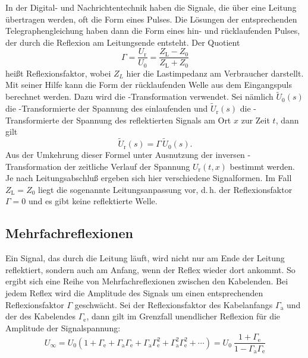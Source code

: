 In der Digital- und Nachrichtentechnik haben die Signale, die über eine
Leitung übertragen werden, oft die Form eines Pulses.  Die Lösungen der
entsprechenden Telegraphengleichung haben dann die Form eines hin- und
rücklaufenden Pulses, der durch die Reflexion am Leitungsende entsteht.
Der Quotient
%
\begin{equation}
  \Gamma = \frac{U_\text{r}}{U_0} = \frac{Z_\text{L} - Z_0}{Z_\text{L} + Z_0}
\end{equation}
%
heißt Reflexionsfaktor, wobei $Z_L$ hier die Lastimpedanz am Verbraucher
darstellt.  Mit seiner Hilfe kann die Form der rücklaufenden Welle aus
dem Eingangspuls berechnet werden.  Dazu wird die
-Transformation verwendet.  Sei nämlich $\tilde{U}_0(s)$
die -Transformierte der Spannung des einlaufenden und
$\tilde{U}_\text{r}(s)$ die -Transformierte der Spannung
des reflektierten Signals am Ort $x$ zur Zeit $t$, dann gilt
%
\begin{equation}
  \label{eq:reflex}
  \tilde{U}_\text{r}(s) = \Gamma\, \tilde{U}_0(s).
\end{equation}
%
Aus der Umkehrung dieser Formel unter Ausnutzung der inversen
-Transformation der zeitliche Verlauf der Spannung
$U_\text{r}(t, x)$ bestimmt werden.  Je nach Leitungsabschluß ergeben
sich hier verschiedene Signalformen.  Im Fall $Z_\text{L} = Z_0$ liegt
die sogenannte Leitungsanpassung vor, d.\,h. der Reflexionsfaktor
$\Gamma = 0$ und es gibt keine reflektierte Welle.

\subsection{Mehrfachreflexionen}

Ein Signal, das durch die Leitung läuft, wird nicht nur am Ende der
Leitung reflektiert, sondern auch am Anfang, wenn der Reflex wieder dort
ankommt.  So ergibt sich eine Reihe von Mehrfachreflexionen zwischen den
Kabelenden.  Bei jedem Reflex wird die Amplitude des Signals um einen
entsprechenden Reflexionsfaktor $\Gamma$ geschwächt.  Sei der
Reflexionsfaktor des Kabelanfangs $\Gamma_\text{a}$ und der des
Kabelendes $\Gamma_\text{e}$, dann gilt im Grenzfall unendlicher
Reflexion für die Amplitude der Signalspannung:
%
\begin{equation}
  U_\infty = U_0(1 + \Gamma_\text{e} + \Gamma_\text{a} \Gamma_\text{e}
  + \Gamma_\text{a} \Gamma_\text{e}^2 + \Gamma_\text{a}^2
  \Gamma_\text{e}^2 + \dotsb) = U_0 \:\frac{1 + \Gamma_\text{e}}{1
    - \Gamma_\text{a} \Gamma_\text{e}}
\end{equation}
%

